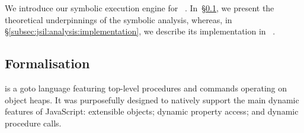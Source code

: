
% 
% 

We introduce our symbolic execution engine for \jsil~\cite{javert}. In~\S\ref{subsec:jsil:analysis:formalism}, we present 
the theoretical underpinnings of the symbolic analysis, whereas, in \S\ref{subsec:jsil:analysis:implementation}, 
we describe its implementation in \rosette~\cite{Rosette1,Rosette2}.

\vspace{-10pt}
\subsection{Formalisation}\label{subsec:jsil:analysis:formalism}

 \jsil is a goto language featuring top-level procedures and commands operating on object heaps. It was purposefully designed to natively support the main dynamic features of JavaScript: extensible objects; dynamic property access; and dynamic procedure calls. 

 
